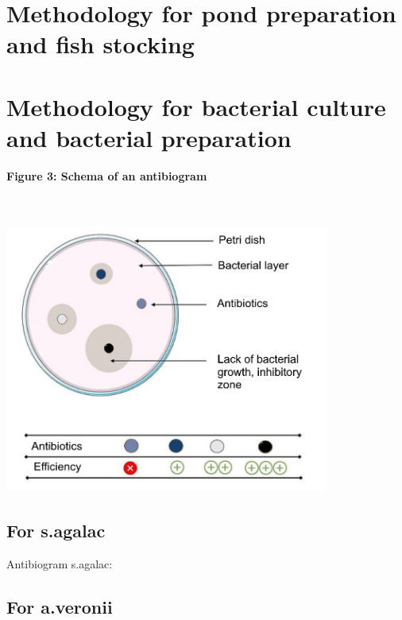 \section{Methodology for pond preparation and fish stocking}

\newpage

\section{Methodology for bacterial culture and bacterial preparation}

\beginfigure
  \begin{center}
  \begin{flushleft}
  \caption{\textbf{Figure 3: Schema of an antibiogram}}
  \end{flushleft} \\
  \\
  \includegraphics[width=0.8\textwidth, height=0.8\textheight, 
                 keepaspectratio]{figures/Figure3a.png}
  \label{Figure 3: Schema of an antibiogram (general principle)}
  \endfigure
  \end{center}


\subsection{For \ac{s.agalac}}

Antibiogram \ac{s.agalac}: 

\subsection{For \ac{a.veronii}}

